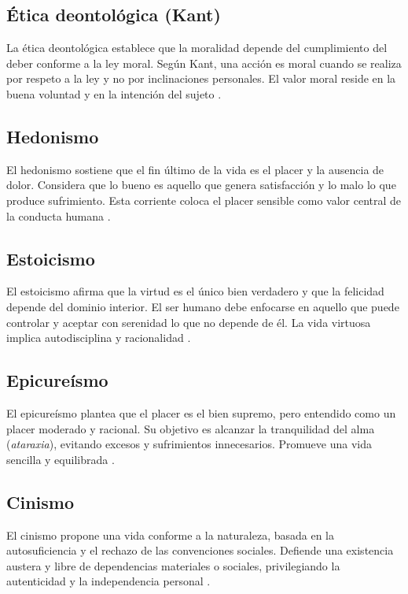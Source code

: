 \documentclass[
	spanish, %
	letterpaper, oneside
]{article}
\begin{document}
\subsection*{Ética deontológica (Kant)}

La ética deontológica establece que la moralidad depende del cumplimiento del deber conforme a la ley moral. Según Kant, una acción es moral cuando se realiza por respeto a la ley y no por inclinaciones personales. El valor moral reside en la buena voluntad y en la intención del sujeto \citep{huerta2000etica}.

\subsection*{Hedonismo}

El hedonismo sostiene que el fin último de la vida es el placer y la ausencia de dolor. Considera que lo bueno es aquello que genera satisfacción y lo malo lo que produce sufrimiento. Esta corriente coloca el placer sensible como valor central de la conducta humana \citep{huerta2000etica}.

\subsection*{Estoicismo}

El estoicismo afirma que la virtud es el único bien verdadero y que la felicidad depende del dominio interior. El ser humano debe enfocarse en aquello que puede controlar y aceptar con serenidad lo que no depende de él. La vida virtuosa implica autodisciplina y racionalidad \citep{huerta2000etica}.

\subsection*{Epicureísmo}

El epicureísmo plantea que el placer es el bien supremo, pero entendido como un placer moderado y racional. Su objetivo es alcanzar la tranquilidad del alma (\textit{ataraxia}), evitando excesos y sufrimientos innecesarios. Promueve una vida sencilla y equilibrada \citep{huerta2000etica}.

\subsection*{Cinismo}

El cinismo propone una vida conforme a la naturaleza, basada en la autosuficiencia y el rechazo de las convenciones sociales. Defiende una existencia austera y libre de dependencias materiales o sociales, privilegiando la autenticidad y la independencia personal \citep{huerta2000etica}.
\end{document}
